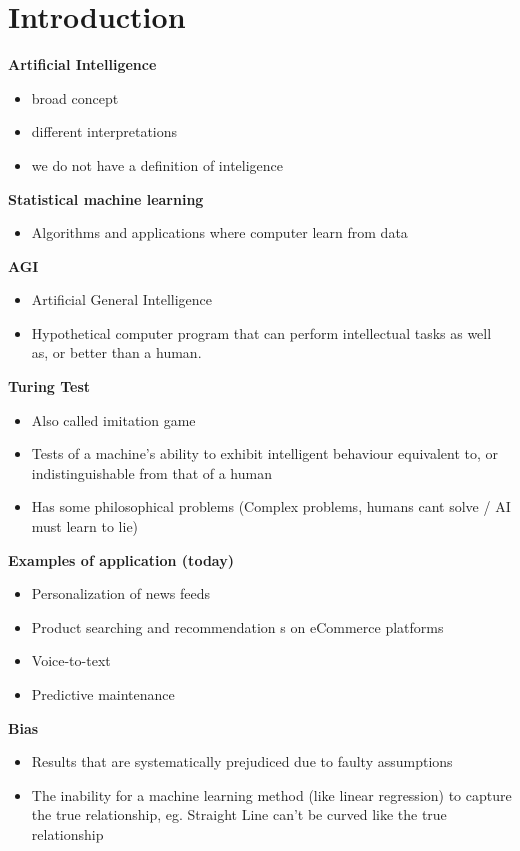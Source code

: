 
\section{Introduction}
\textbf{Artificial Intelligence}
\begin{itemize}
    \item broad concept
    \item different interpretations
    \item we do not have a definition of inteligence
\end{itemize}
\textbf{Statistical machine learning}
\begin{itemize}
    \item Algorithms and applications where computer learn from data
\end{itemize}
\textbf{AGI}
\begin{itemize}
    \item Artificial General Intelligence
    \item Hypothetical computer program that can perform intellectual tasks as well as, or better than a human.
\end{itemize}
\textbf{Turing Test}
\begin{itemize}
    \item Also called imitation game
    \item Tests of a machine's ability to exhibit intelligent behaviour equivalent to, or indistinguishable from that of a human
    \item Has some philosophical problems (Complex problems, humans cant solve / AI must learn to lie)
\end{itemize}
\textbf{Examples of application (today)}
\begin{itemize}
    \item Personalization of news feeds
    \item Product searching and recommendation s on eCommerce platforms
    \item Voice-to-text
    \item Predictive maintenance
\end{itemize}
\textbf{Bias}
\begin{itemize}
    \item Results that are systematically prejudiced due to faulty assumptions
    \item The inability for a machine learning method (like linear regression) to capture the true relationship, eg. Straight Line can't be curved like the true relationship
\end{itemize}
